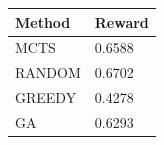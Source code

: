 \begin{tabular}{ll}
\hline
Method & Reward \\
\hline
  MCTS & 0.6588 \\
  RANDOM & 0.6702 \\
  GREEDY & 0.4278 \\
  GA & 0.6293 \\
\hline
\end{tabular}
